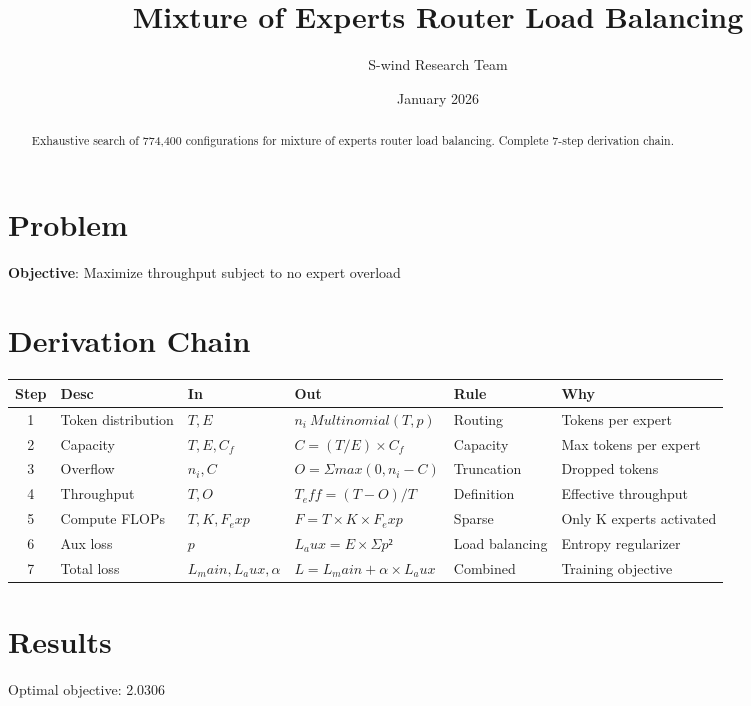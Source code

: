 \documentclass[11pt]{article}
\title{Mixture of Experts Router Load Balancing}
\author{S-wind Research Team}
\date{January 2026}
\begin{document}
\maketitle

\begin{abstract}
Exhaustive search of 774,400 configurations for mixture of experts router load balancing. Complete 7-step derivation chain.
\end{abstract}

\section{Problem}
\textbf{Objective}: Maximize throughput subject to no expert overload

\section{Derivation Chain}
\begin{longtable}{|c|p{2cm}|p{2cm}|p{3cm}|p{2cm}|p{3cm}|}
\hline
Step & Desc & In & Out & Rule & Why\\\hline\endhead
1 & Token distribution & $T, E$ & $n_i ~ Multinomial(T, p)$ & Routing & Tokens per expert\\\hline
2 & Capacity & $T, E, C_f$ & $C = (T/E)×C_f$ & Capacity & Max tokens per expert\\\hline
3 & Overflow & $n_i, C$ & $O = Σmax(0, n_i - C)$ & Truncation & Dropped tokens\\\hline
4 & Throughput & $T, O$ & $T_eff = (T - O)/T$ & Definition & Effective throughput\\\hline
5 & Compute FLOPs & $T, K, F_exp$ & $F = T×K×F_exp$ & Sparse & Only K experts activated\\\hline
6 & Aux loss & $p$ & $L_aux = E×Σp²$ & Load balancing & Entropy regularizer\\\hline
7 & Total loss & $L_main, L_aux, α$ & $L = L_main + α×L_aux$ & Combined & Training objective\\\hline
\end{longtable}

\section{Results}
Optimal objective: 2.0306
\end{document}
